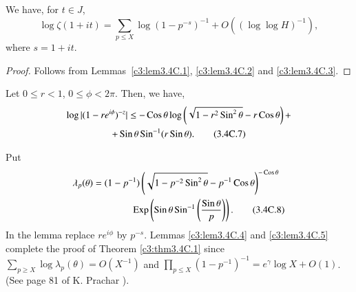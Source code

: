 \begin{alphlemma}\label{c3:lem3.4C.4}
We have, for $t \in J$,
\begin{equation*}
\log \zeta(1 + it) = \sum\limits_{p\leq X} \log (1-p^{-s})^{-1} + O((\log \log H)^{-1}),  
\tag{3.4C.6}\label{c3:eq3.4C.6}
\end{equation*}
where $s =1 + it$.
\end{alphlemma}

\begin{proof}
Follows from Lemmas~\ref{c3:lem3.4C.1}, \ref{c3:lem3.4C.2} and \ref{c3:lem3.4C.3}.
\end{proof}

\begin{alphlemma}\label{c3:lem3.4C.5}
Let $0 \leq r < 1$, $0 \leq \phi < 2\pi$. Then, we have,
\begin{gather*}
\log |(1-re^{i\phi})^{-z}| \leq - \operatorname{Cos} \theta \log \left( \sqrt{1-r^2 \operatorname{Sin}^2 \theta} - r \operatorname{Cos} \theta\right) +\\
+ \operatorname{Sin} \theta \operatorname{Sin}^{-1} (r \operatorname{Sin} \theta).  \tag{3.4C.7}\label{c3:eq3.4C.7}
\end{gather*}
\end{alphlemma}

\begin{remark*}
Put 
\begin{align*}
\lambda_p (\theta) &= (1-p^{-1}) \left(\sqrt{1-p^{-2} \operatorname{Sin}^2 \theta} -
p^{-1} \operatorname{Cos} \theta \right)^{- \operatorname{Cos} \theta}\\ 
&\qquad\qquad\operatorname{Exp} \left(\operatorname{Sin} \theta
\operatorname{Sin}^{-1} \left(\frac{\operatorname{Sin} \theta}{p} \right)
\right). \tag{3.4C.8}\label{c3:eq3.4C.8} 
\end{align*}
In the lemma replace $re^{i\phi}$ by $p^{-s}$. Lemmas
\ref{c3:lem3.4C.4} and \ref{c3:lem3.4C.5} complete the proof of
Theorem 
\ref{c3:thm3.4C.1} since $\sum\limits_{p\geq X} \log \lambda_p(\theta) = O(X^{-1})$ and $\prod\limits_{p\leq X} (1-p^{-1})^{-1} = e^\gamma \log X + O(1)$. (See page 81 of K. Prachar \cite{Prachar1}).
\end{remark*}

